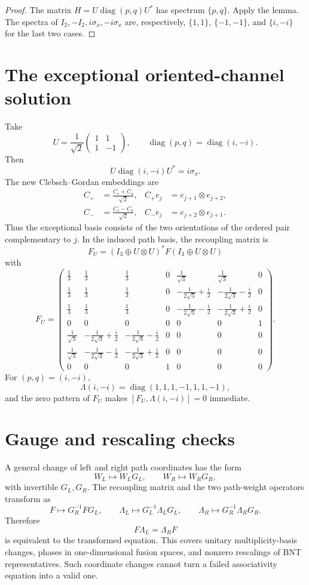 \documentclass{article}
\newcommand{\diag}{\operatorname{diag}}
\begin{document}
\begin{proof}
The matrix $H=U\diag(p,q)U^*$ has spectrum $\{p,q\}$. Apply the lemma.
The spectra of $I_2,-I_2,i\sigma_x,-i\sigma_x$ are, respectively,
$\{1,1\}$, $\{-1,-1\}$, and $\{i,-i\}$ for the last two cases.
\end{proof}

\section{The exceptional oriented-channel solution}

Take
\[
U=\frac1{\sqrt2}\begin{pmatrix}1&1\\1&-1\end{pmatrix},
\qquad
\diag(p,q)=\diag(i,-i).
\]
Then
\[
U\diag(i,-i)U^*=i\sigma_x.
\]
The new Clebsch--Gordan embeddings are
\begin{align*}
C_+&=\frac{C_s+C_a}{\sqrt2},&
C_+e_j&=e_{j+1}\otimes e_{j+2},\\
C_-&=\frac{C_s-C_a}{\sqrt2},&
C_-e_j&=e_{j+2}\otimes e_{j+1}.
\end{align*}
Thus the exceptional basis consists of the two orientations of the ordered
pair complementary to $j$. In the induced path basis, the recoupling matrix
is
\[
F_U=(I_3\oplus U\otimes U)^*F(I_3\oplus U\otimes U)
\]
with
\[
F_U=
\begin{pmatrix}
\frac13&\frac13&\frac13&0&\frac1{\sqrt3}&\frac1{\sqrt3}&0\\
\frac13&\frac13&\frac13&0&-\frac1{2\sqrt3}+\frac i2&-\frac1{2\sqrt3}-\frac i2&0\\
\frac13&\frac13&\frac13&0&-\frac1{2\sqrt3}-\frac i2&-\frac1{2\sqrt3}+\frac i2&0\\
0&0&0&0&0&0&1\\
\frac1{\sqrt3}&-\frac1{2\sqrt3}+\frac i2&-\frac1{2\sqrt3}-\frac i2&0&0&0&0\\
\frac1{\sqrt3}&-\frac1{2\sqrt3}-\frac i2&-\frac1{2\sqrt3}+\frac i2&0&0&0&0\\
0&0&0&1&0&0&0
\end{pmatrix}.
\]
For $(p,q)=(i,-i)$,
\[
\Lambda(i,-i)=\diag(1,1,1,-1,1,1,-1),
\]
and the zero pattern of $F_U$ makes
$[F_U,\Lambda(i,-i)]=0$ immediate.

\section{Gauge and rescaling checks}

A general change of left and right path coordinates has the form
\[
W_L\mapsto W_LG_L,
\qquad
W_R\mapsto W_RG_R,
\]
with invertible $G_L,G_R$. The recoupling matrix and the two path-weight
operators transform as
\[
F\mapsto G_R^{-1}FG_L,
\qquad
\Lambda_L\mapsto G_L^{-1}\Lambda_LG_L,
\qquad
\Lambda_R\mapsto G_R^{-1}\Lambda_RG_R.
\]
Therefore
\[
F\Lambda_L=\Lambda_RF
\]
is equivalent to the transformed equation. This covers unitary
multiplicity-basis changes, phases in one-dimensional fusion spaces, and
nonzero rescalings of BNT representatives. Such coordinate changes cannot
turn a failed associativity equation into a valid one.
\end{document}
